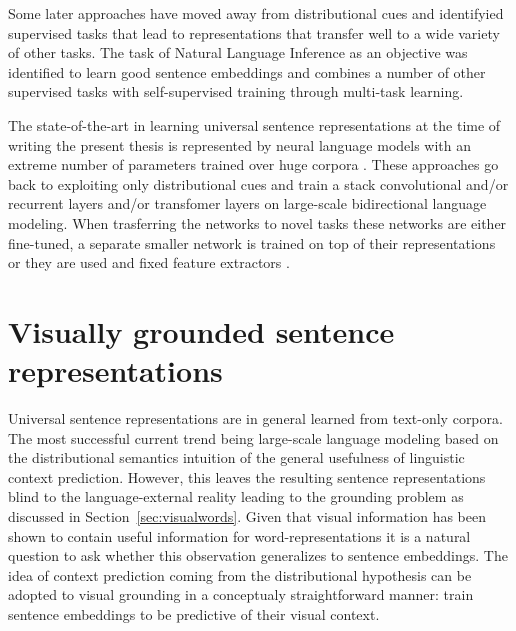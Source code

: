 Some later approaches have  moved away from distributional cues
and identifyied supervised tasks that lead to representations that transfer
well to a wide variety of other tasks. The task of Natural Language Inference \citep{bowman2015large,williams2017broad} as an objective
was identified to learn good sentence embeddings \citep{conneau-EtAl:2017:EMNLP2017,kiros2018inferlite}
and \cite{subramanian2018learning} combines a number of other supervised tasks
with self-supervised training through multi-task learning.


The state-of-the-art in learning universal sentence representations
at the time of writing the present thesis is
represented by neural language models with an extreme number of parameters
trained over huge corpora \citep{peters2018deep,devlin2018bert}.
These approaches go back to
exploiting only distributional cues and train a stack convolutional and/or recurrent layers
and/or transfomer layers on large-scale bidirectional language modeling.
When trasferring the networks to novel tasks these networks are either fine-tuned, a
separate smaller network is trained on top of their representations or they are used and
fixed feature extractors \citep{howard2018universal,peters2019tune}.

\section{Visually grounded sentence representations}
\label{sec:visualsentences}

Universal sentence representations are in general learned from text-only corpora. The most 
successful current trend being large-scale language modeling based on
the distributional semantics intuition of the general usefulness of linguistic context prediction.
However, this leaves the resulting sentence representations blind to the language-external 
reality leading to the grounding problem
as discussed in Section~\ref{sec:visualwords}. Given that visual information
has been shown to contain useful information for word-representations it
is a natural question to ask whether this observation generalizes to sentence
embeddings. The idea of context prediction coming from the distributional 
hypothesis can be adopted to visual grounding in a conceptualy straightforward manner:
train sentence embeddings to be predictive of their visual context. 

